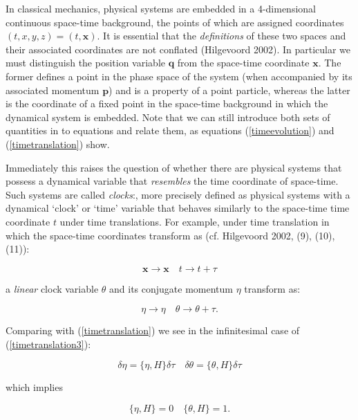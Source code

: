 \documentclass{article}
\begin{document}
In classical mechanics, physical systems are embedded in a 4-dimensional continuous space-time background, the points of which are assigned coordinates $(t,x,y,z) = (t, \boldsymbol{x})$.
It is essential that the \textit{definitions} of these two spaces and their associated coordinates are not conflated (Hilgevoord 2002). In particular we must distinguish the position variable $\boldsymbol{q}$ from the space-time coordinate $\boldsymbol{x}$. The former defines a point in the phase space of the system (when accompanied by its associated momentum $\boldsymbol{p}$) and is a property of a point particle, whereas the latter is the coordinate of a fixed point in the space-time background in which the dynamical system is embedded. Note that we can still introduce both sets of quantities in to equations and relate them, as equations (\ref{timeevolution}) and (\ref{timetranslation}) show.

Immediately this raises the question of whether there are physical systems that possess a dynamical variable that \textit{resembles} the time coordinate of space-time. Such systems are called \textit{clocks}:, more precisely defined as physical systems with a dynamical `clock' or `time' variable that behaves similarly to the space-time time coordinate $t$ under time translations. For example, under time translation in which the space-time coordinates transform as (cf. Hilgevoord 2002, (9), (10), (11)):

\begin{equation}
\boldsymbol{x} \rightarrow \boldsymbol{x} \quad t \rightarrow t+\tau
\label{timetranslation2}
\end{equation}

\noindent a \textit{linear} clock variable $\theta$ and its conjugate momentum $\eta$ transform as:

\begin{equation}
	\eta \rightarrow \eta \quad \theta \rightarrow \theta + \tau.
	\label{timetranslation3}
\end{equation}

\noindent Comparing with (\ref{timetranslation}) we see in the infinitesimal case of (\ref{timetranslation3}):

\begin{equation}
	\delta\eta=\{\eta, H\}\delta\tau \quad \delta\theta = \{\theta, H\}\delta\tau
	\label{timetranslation4}
\end{equation}

\noindent which implies

\begin{equation}
	\{\eta, H\}=0 \quad \{\theta, H\}=1.
	\label{timetranslation5}
\end{equation}
\end{document}
